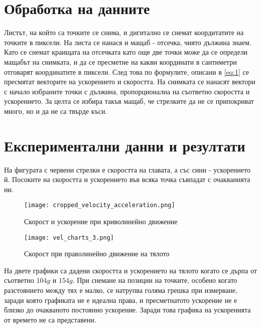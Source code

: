 \documentclass[aps, prb, twocolumn, a4paper, floatfix, reprint]{revtex4-2}
\begin{document}
\section{Обработка на данните}
Листът, на който са точките се снима, и дигитално се снемат коордитатите на точките в пиксели. На листа се нанася и мащаб - отсечка, чиято дължина знаем. Като се снемат краищата на отсечката като още две точки може да се определи мащабът на снимката, и да се пресметне на какви координати в сантиметри отговарят координатите в пиксели. След това по формулите, описани в \eqref{eq:1} се пресмятат векторите на ускорението и скоростта. На снимката се нанасят вектори с начало избраните точки с дължина, пропорционална на съответно скоростта и ускорението. За целта се избира такъв мащаб, че стрелките да не се припокриват много, но и да не са твърде къси. 

\section{Експериментални данни и резултати}

На фигурата с червени стрелки е скоростта на главата, а със сини - ускорението й. Посоките на скоростта и ускорението във всяка точка съвпадат с очакванията ни.
\begin{figure}[h]
    \caption{Скорост и ускорение при криволинейно движение}
    \texttt{[image: cropped\_velocity\_acceleration.png]}
\end{figure}

\begin{figure}[H]
    \caption{Скорост при праволинейно движение на тялото}
    \texttt{[image: vel\_charts\_3.png]}
\end{figure}

На двете графики са дадени скоростта и ускорението на тялото когато се дърпа от съответно $104 g$ и $154 g$. При снемане на позиции на точките, особено когато разстоянието между тях е малко, се натрупва голяма грешка при измерване, заради която графиката не е идеална права, и пресметнатото ускорение не е близко до очакваното постоянно ускорение. Заради това графика на ускоренията от времето не са представени. 
\end{document}
